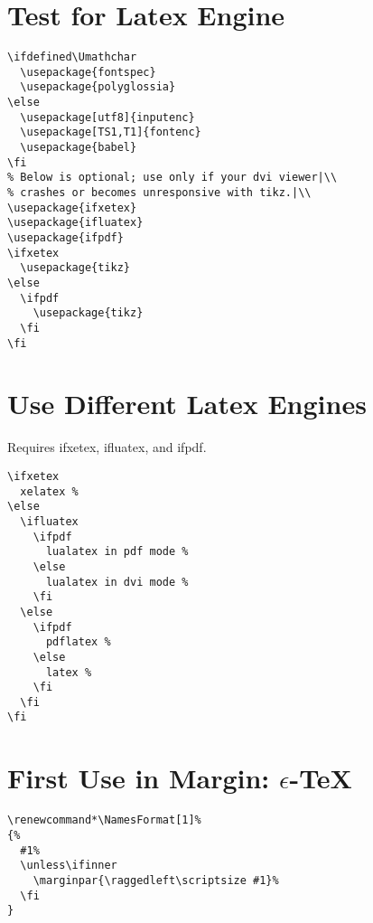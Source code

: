 \documentclass{article}
\begin{document}

\section{Test for Latex Engine}
\begin{verbatim}
\ifdefined\Umathchar
  \usepackage{fontspec}
  \usepackage{polyglossia}
\else
  \usepackage[utf8]{inputenc}
  \usepackage[TS1,T1]{fontenc}
  \usepackage{babel}
\fi
% Below is optional; use only if your dvi viewer|\\
% crashes or becomes unresponsive with tikz.|\\
\usepackage{ifxetex}
\usepackage{ifluatex}
\usepackage{ifpdf}
\ifxetex
  \usepackage{tikz}
\else
  \ifpdf
    \usepackage{tikz}
  \fi
\fi
\end{verbatim}

\section{Use Different Latex Engines}
Requires \textsf{ifxetex}, \textsf{ifluatex}, and \textsf{ifpdf}.
\begin{verbatim}
\ifxetex
  xelatex %
\else
  \ifluatex
    \ifpdf
      lualatex in pdf mode %
    \else
      lualatex in dvi mode %
    \fi
  \else
    \ifpdf
      pdflatex %
    \else
      latex %
    \fi
  \fi
\fi
\end{verbatim}

\section{First Use in Margin: $\epsilon$-\TeX}
\begin{verbatim}
\renewcommand*\NamesFormat[1]%
{%
  #1%
  \unless\ifinner
    \marginpar{\raggedleft\scriptsize #1}%
  \fi
}
\end{verbatim}
\end{document}
